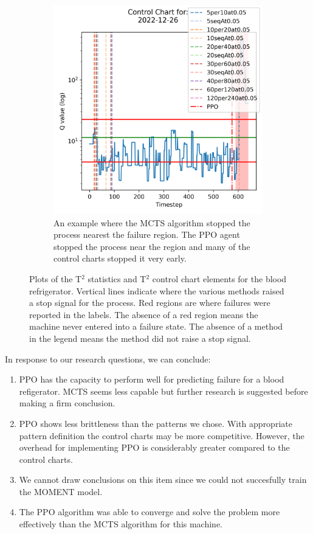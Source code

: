 \documentclass[12pt]{article}
\begin{document}
\begin{figure}[ht!]
\begin{subfigure}[b]{0.475\textwidth}
        \includegraphics[width=\textwidth]{assets/spc/blood-refrigerator/T-sq-cchart-2022-12-26.png}
        \caption{{\small An example where the MCTS algorithm stopped the process nearest the failure region. The PPO agent stopped the process near the region and many of the control charts stopped it very early.}}
    \end{subfigure}
    \caption{Plots of the T$^2$ statistics and T$^2$ control chart elements for the blood refrigerator. Vertical lines indicate where the various methods raised a stop signal for the process. Red regions are where failures were reported in the labels. The absence of a red region means the machine never entered into a failure state. The absence of a method in the legend means the method did not raise a stop signal.}
\end{figure}

In response to our research questions, we can conclude:
\begin{enumerate}
    \item PPO has the capacity to perform well for predicting failure for a blood refigerator. MCTS seems less capable but further research is suggested before making a firm conclusion.
    \item PPO shows less brittleness than the patterns we chose. With appropriate pattern definition the control charts may be more competitive. However, the overhead for implementing PPO is considerably greater compared to the control charts.
    \item We cannot draw conclusions on this item since we could not succesfully train the MOMENT model.
    \item The PPO algorithm was able to converge and solve the problem more effectively than the MCTS algorithm for this machine.
\end{enumerate}
\end{document}
